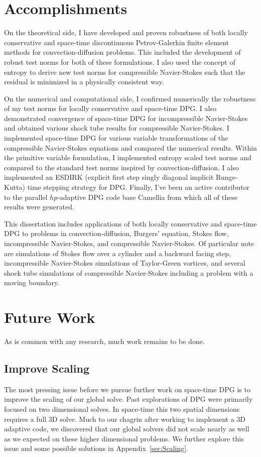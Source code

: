 \documentclass[Dissertation.tex]{subfiles}
\begin{document}
\section{Accomplishments}
On the theoretical side, I have developed and proven robustness of both locally conservative and space-time
discontinuous Petrov-Galerkin finite element methods for convection-diffusion problems.
This included the development of robust test norms for both of these formulations.
I also used the concept of entropy to derive new test norms for compressible Navier-Stokes
such that the residual is minimized in a physically consistent way.

On the numerical and computational side, I confirmed numerically the robustness of my test norms for
locally conservative and space-time DPG.
I also demonstrated convergence of space-time DPG for incompressible Navier-Stokes and 
obtained various shock tube results for compressible Navier-Stokes.
I implemented space-time DPG for various variable transformations of the compressible Navier-Stokes
equations and compared the numerical results.
Within the primitive variable formulation, I implemented entropy scaled test norms and 
compared to the standard test norms inspired by convection-diffusion.
I also implemented an ESDIRK (explicit first step singly diagonal implicit Runge-Kutta) time stepping
strategy for DPG.
Finally, I've been an active contributor to the parallel $hp$-adaptive DPG code base Camellia\cite{CamelliaDPG}
from which all of these results were generated.

This dissertation includes applications of both locally conservative and space-time DPG to problems
in convection-diffusion, Burgers' equation, Stokes flow, incompressible Navier-Stokes,
and compressible Navier-Stokes.
Of particular note are simulations of Stokes flow over a cylinder and a backward facing step,
incompressible Navier-Stokes simulations of Taylor-Green vortices, and several shock tube simulations
of compressible Navier-Stokes including a problem with a moving boundary.

\section{Future Work}
As is common with any research, much work remains to be done.

\subsection{Improve Scaling}
The most pressing issue before we pursue further work on space-time DPG is to improve the scaling
of our global solve.
Past explorations of DPG were primarily focused on two dimensional solves.
In space-time this two spatial dimensions requires a full 3D solve.
Much to our chagrin after working to implement a 3D adaptive code, we discovered that 
our global solvers did not scale nearly as well as we expected on these higher dimensional problems.
We further explore this issue and some possible solutions in Appendix~\ref{sec:Scaling}.
\end{document}
